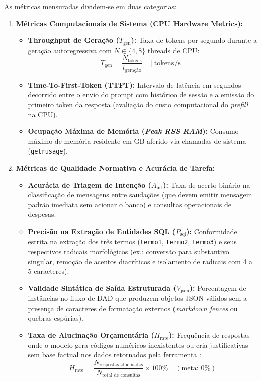 \documentclass[11pt]{article}
\begin{document}
As métricas mensuradas dividem-se em duas categorias:
\begin{enumerate}
    \item \textbf{Métricas Computacionais de Sistema (CPU Hardware Metrics):}
    \begin{itemize}
        \item \textbf{Throughput de Geração ($T_{\text{gen}}$):} Taxa de tokens por segundo durante a geração autoregressiva com $N \in \{4, 8\}$ threads de CPU:
        \begin{equation}
            T_{\text{gen}} = \frac{N_{\text{tokens}}}{t_{\text{geração}}} \quad [\text{tokens/s}]
        \end{equation}
        \item \textbf{Time-To-First-Token (TTFT):} Intervalo de latência em segundos decorrido entre o envio do prompt com histórico de sessão e a emissão do primeiro token da resposta (avaliação do custo computacional do \textit{prefill} na CPU).
        \item \textbf{Ocupação Máxima de Memória (\textit{Peak RSS RAM}):} Consumo máximo de memória residente em GB aferido via chamadas de sistema (\texttt{getrusage}).
    \end{itemize}
    \item \textbf{Métricas de Qualidade Normativa e Acurácia de Tarefa:}
    \begin{itemize}
        \item \textbf{Acurácia de Triagem de Intenção ($A_{\text{int}}$):} Taxa de acerto binário na classificação de mensagens entre saudações (que devem emitir mensagem padrão imediata sem acionar o banco) e consultas operacionais de despesas.
        \item \textbf{Precisão na Extração de Entidades SQL ($P_{\text{sql}}$):} Conformidade estrita na extração dos três termos (\texttt{termo1}, \texttt{termo2}, \texttt{termo3}) e seus respectivos radicais morfológicos (ex.: conversão para substantivo singular, remoção de acentos diacríticos e isolamento de radicais com 4 a 5 caracteres).
        \item \textbf{Validade Sintática de Saída Estruturada ($V_{\text{json}}$):} Porcentagem de instâncias no fluxo de DAD que produzem objetos JSON válidos sem a presença de caracteres de formatação externos (\textit{markdown fences} ou quebras espúrias).
        \item \textbf{Taxa de Alucinação Orçamentária ($H_{\text{rate}}$):} Frequência de respostas onde o modelo gera códigos numéricos inexistentes ou cria justificativas sem base factual nos dados retornados pela ferramenta \citep{ji2023survey}:
        \begin{equation}
            H_{\text{rate}} = \frac{N_{\text{respostas alucinadas}}}{N_{\text{total de consultas}}} \times 100\% \quad (\text{meta: } 0\%)
        \end{equation}
    \end{itemize}
\end{enumerate}
\end{document}
